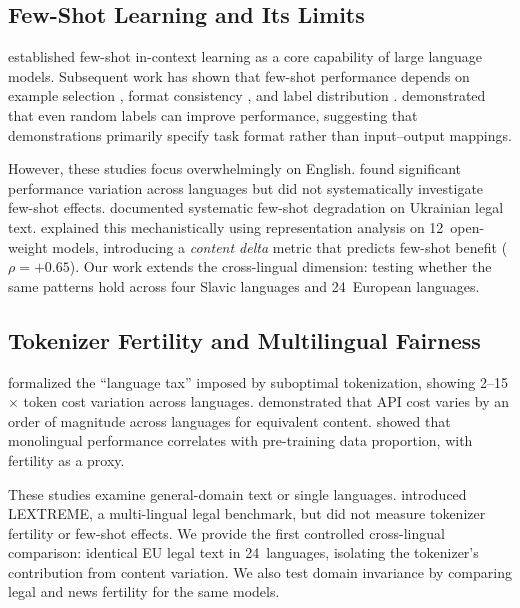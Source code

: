 \documentclass[11pt,a4paper]{article}
\begin{document}
\subsection{Few-Shot Learning and Its Limits}

\citet{brown2020language} established few-shot in-context learning as a core capability of large language models. Subsequent work has shown that few-shot performance depends on example selection \citep{liu2022makes}, format consistency \citep{min2022rethinking}, and label distribution \citep{zhao2021calibrate}. \citet{min2022rethinking} demonstrated that even random labels can improve performance, suggesting that demonstrations primarily specify task format rather than input--output mappings.

However, these studies focus overwhelmingly on English. \citet{lai2023chatgpt} found significant performance variation across languages but did not systematically investigate few-shot effects. \citet{ovcharov2026tokenizer} documented systematic few-shot degradation on Ukrainian legal text. \citet{ovcharov2026fewshot} explained this mechanistically using representation analysis on 12~open-weight models, introducing a \emph{content delta} metric that predicts few-shot benefit ($\rho = +0.65$). Our work extends the cross-lingual dimension: testing whether the same patterns hold across four Slavic languages and 24~European languages.

\subsection{Tokenizer Fertility and Multilingual Fairness}

\citet{petrov2024language} formalized the ``language tax'' imposed by suboptimal tokenization, showing 2--15$\times$ token cost variation across languages. \citet{ahia2023all} demonstrated that API cost varies by an order of magnitude across languages for equivalent content. \citet{rust2021good} showed that monolingual performance correlates with pre-training data proportion, with fertility as a proxy.

These studies examine general-domain text or single languages. \citet{niklaus2024lextreme} introduced LEXTREME, a multi-lingual legal benchmark, but did not measure tokenizer fertility or few-shot effects. We provide the first controlled cross-lingual comparison: identical EU legal text in 24~languages, isolating the tokenizer's contribution from content variation. We also test domain invariance by comparing legal and news fertility for the same models.
\end{document}
